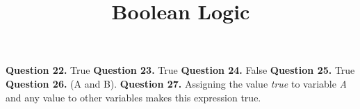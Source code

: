 \documentclass{ximera}
\title{Boolean Logic}
\begin{document}
\maketitle

\textbf{Question 22.} True
\textbf{Question 23.} True
\textbf{Question 24.} False
\textbf{Question 25.} True
\textbf{Question 26.} (A and B).
\textbf{Question 27.} Assigning the value \emph{true} to variable \emph{A} and any value to other variables makes this expression true. 
\end{document}
